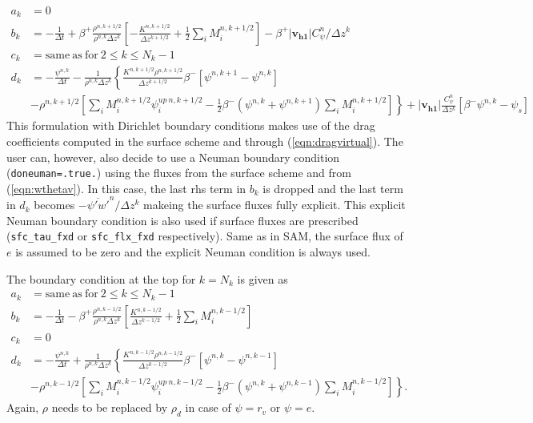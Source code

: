 \documentclass[dvipdfmx,a4paper,10pt]{article}
\begin{document}
\begin{align*}
  a_k &= 0 \\
    b_k &= -\frac{1}{\Delta t} + \beta^+\frac{\rho^{n,k+1/2}}{\rho^{n,k}\Delta z^k} \left[-\frac{K^{n,k+1/2}}{\Delta z^{k+1/2}}+\frac{1}{2}\sum_iM_i^{n,k+1/2} \right]-\beta^+|\mathbf{v_{h1}}|C^n_{\psi}/\Delta z^k  \\
      c_k &= \mathrm{same~as~for~}2\leq k \leq N_k-1 \\
      d_k &=  -\frac{\psi^{n,k}}{\Delta t} - \frac{1}{\rho^{n,k}\Delta z^k} \left\{ \frac{K^{n,k+1/2}\rho^{n,k+1/2}}{\Delta z^{k+1/2}}\beta^{-}\left[\psi^{n,k+1} - \psi^{n,k}\right]\right.   \\   
          & \left. -\rho^{n,k+1/2}\left[\sum_iM_i^{n,k+1/2}\psi_i^{up~n,k+1/2} - \frac{1}{2}\beta^{-}(\psi^{n,k}+\psi^{n,k+1})\sum_iM_i^{n,k+1/2} \right] \right\} +|\mathbf{v_{h1}}|\frac{C^n_{\psi}}{\Delta z^k}\left[\beta^-\psi^{n,k} - \psi_s\right]    
\end{align*}
This formulation with Dirichlet boundary conditions makes use of the drag coefficients computed in the surface scheme and through (\ref{eqn:dragvirtual}). The user can, however, also decide to use a Neuman boundary condition ({\tt doneuman=.true.}) using the fluxes from the surface scheme and from (\ref{eqn:wthetav}). In this case, the last rhs term in $b_k$ is dropped and the last term in $d_k$ becomes $- \overline{\psi'w'}^n/\Delta z^k$ makeing the surface fluxes fully explicit. This explicit Neuman boundary condition is also used if surface fluxes are prescribed ({\tt sfc\_tau\_fxd} or {\tt sfc\_flx\_fxd} respectively). Same as in SAM, the surface flux of $e$ is assumed to be zero and the explicit Neuman condition is always used. 

The boundary condition at the top for $k=N_k$ is given as
\begin{align*}
  a_k &= \mathrm{same~as~for~}2\leq k \leq N_k-1  \\
    b_k &= -\frac{1}{\Delta t} - \beta^+\frac{\rho^{n,k-1/2}}{\rho^{n,k}\Delta z^k} \left[\frac{K^{n,k-1/2}}{\Delta z ^{k-1/2}}+\frac{1}{2}\sum_iM_i^{n,k-1/2} \right] \\
      c_k &= 0 \\
      d_k &= -\frac{\psi^{n,k}}{\Delta t} + \frac{1}{\rho^{n,k}\Delta z^k} \left\{ \frac{K^{n,k-1/2}\rho^{n,k-1/2}}{\Delta z^{k-1/2}}\beta^{-}\left[\psi^{n,k} - \psi^{n,k-1}\right]\right.   \\   
          & \left.-\rho^{n,k-1/2}\left[\sum_iM_i^{n,k-1/2}\psi_i^{up~n,k-1/2} - \frac{1}{2}\beta^{-}(\psi^{n,k}+\psi^{n,k-1})\sum_iM_i^{n,k-1/2} \right]\right\}.    
\end{align*}
Again, $\rho$ needs to be replaced by $\rho_d$ in case of $\psi=r_v$ or $\psi=e$. 
\end{document}
